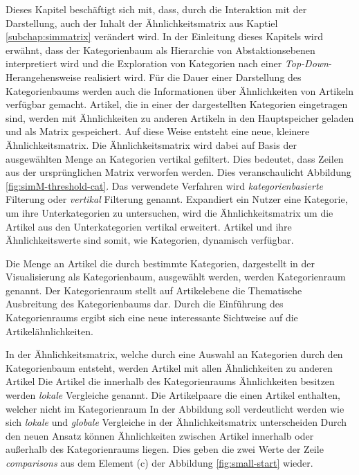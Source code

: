 Dieses Kapitel beschäftigt sich mit, dass, durch die Interaktion mit der Darstellung, auch der Inhalt der Ähnlichkeitsmatrix aus Kaptiel \ref{subchap:simmatrix} verändert wird.
In der Einleitung dieses Kapitels wird erwähnt, dass der Kategorienbaum als Hierarchie von Abstaktionsebenen interpretiert wird und die Exploration von Kategorien nach einer \emph{Top-Down}-Herangehensweise realisiert wird.
Für die Dauer einer Darstellung des Kategorienbaums werden auch die Informationen über Ähnlichkeiten von Artikeln verfügbar gemacht.
Artikel, die in einer der dargestellten Kategorien eingetragen sind, werden mit Ähnlichkeiten zu anderen Artikeln in den Hauptspeicher geladen und als Matrix gespeichert.
Auf diese Weise entsteht eine neue, kleinere Ähnlichkeitsmatrix.
Die Ähnlichkeitsmatrix wird dabei auf Basis der ausgewählten Menge an Kategorien vertikal gefiltert.
Dies bedeutet, dass Zeilen aus der ursprünglichen Matrix verworfen werden.
Dies veranschaulicht Abbildung \ref{fig:simM-threshold-cat}.
Das verwendete Verfahren wird \emph{kategorienbasierte} Filterung oder \emph{vertikal} Filterung genannt.
Expandiert ein Nutzer eine Kategorie, um ihre Unterkategorien zu untersuchen, wird die Ähnlichkeitsmatrix um die Artikel aus den Unterkategorien vertikal erweitert.
Artikel und ihre Ähnlichkeitswerte sind somit, wie Kategorien, dynamisch verfügbar.

Die Menge an Artikel die durch bestimmte Kategorien, dargestellt in der Visualisierung als Kategorienbaum, ausgewählt werden, werden Kategorienraum genannt. 
Der Kategorienraum stellt auf Artikelebene die Thematische Ausbreitung des Kategorienbaums dar.
Durch die Einführung  des Kategorienraums ergibt sich eine neue interessante Sichtweise auf die Artikelähnlichkeiten.

 
In der Ähnlichkeitsmatrix, welche durch eine Auswahl an Kategorien durch den Kategorienbaum entsteht, werden Artikel mit allen Ähnlichkeiten zu anderen Artikel 
Die Artikel die innerhalb des Kategorienraums Ähnlichkeiten besitzen werden \emph{lokale} Vergleiche genannt.
Die Artikelpaare die einen Artikel enthalten, welcher nicht im Kategorienraum  
In der Abbildung soll verdeutlicht werden wie sich \emph{lokale} und \emph{globale} Vergleiche in der Ähnlichkeitsmatrix unterscheiden
Durch den neuen Ansatz können Ähnlichkeiten zwischen Artikel innerhalb oder außerhalb des Kategorienraums liegen.
Dies geben die zwei Werte der Zeile \emph{comparisons} aus dem Element (c) der Abbildung \ref{fig:small-start} wieder.

